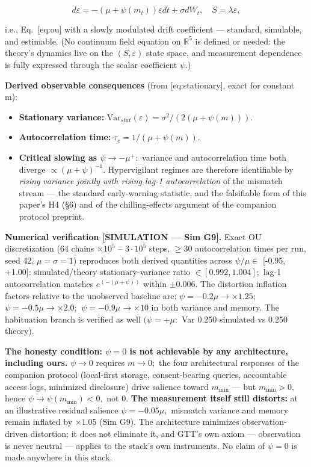 \documentclass[
]{article}
\begin{document}
\begin{equation}
d\varepsilon = -(\mu + \psi(m_t)) \varepsilon dt + \sigma dW_t, \quad \dot{S} = \lambda \varepsilon,
\label{eq:oupsi}
\end{equation}

i.e., Eq.~{[}eq:ou{]} with a slowly modulated drift coefficient ---
standard, simulable, and estimable. (No continuum field equation on
\(\mathbb{R}^{5}\) is defined or needed: the theory's dynamics live on
the \((S, \varepsilon)\) state space, and measurement dependence is
fully expressed through the scalar coefficient \(\psi.\))

\textbf{Derived observable consequences} (from {[}eq:stationary{]},
exact for constant m):

\begin{itemize}
\item
  \textbf{Stationary variance:}
  \(\mathrm{Var}_{stat}(\varepsilon) = \sigma^{2} / (2(\mu + \psi(m))).\)
\item
  \textbf{Autocorrelation time:} \(\tau_c = 1 / (\mu + \psi(m)).\)
\item
  \textbf{Critical slowing as \(\psi \to -\mu^{+}:\)} variance and
  autocorrelation time both diverge \(\propto (\mu + \psi)^{-1}.\)
  Hypervigilant regimes are therefore identifiable by \emph{rising
  variance jointly with rising lag-1 autocorrelation} of the mismatch
  stream --- the standard early-warning statistic, and the falsifiable
  form of this paper's H4 (§6) and of the chilling-effects argument of
  the companion protocol preprint.
\end{itemize}

\textbf{Numerical verification {[}SIMULATION --- Sim G9{]}.} Exact OU
discretization (64 chains \(\times 10^{5}\) -- \(3\cdot10^{5}\) steps,
\(\geq 30\) autocorrelation times per run, seed 42,
\(\mu = \sigma = 1\)) reproduces both derived quantities across
\(\psi/\mu \in\) {[}-0.95, +1.00{]}: simulated/theory
stationary-variance ratio \(\in [0.992, 1.004];\) lag-1 autocorrelation
matches \(e^(-(\mu+\psi))\) within \(\pm0.006.\) The distortion
inflation factors relative to the unobserved baseline are:
\textbf{\(\psi = -0.2\mu \to \times1.25;\)
\(\psi = -0.5\mu \to \times2.0;\) \(\psi = -0.9\mu \to \times10\)} in
both variance and memory. The habituation branch is verified as well
\((\psi = +\mu:\) Var 0.250 simulated vs 0.250 theory).

\textbf{The honesty condition: \(\psi = 0\) is not achievable by any
architecture, including ours.} \(\psi \to 0\) requires \(m \to 0;\) the
four architectural responses of the companion protocol (local-first
storage, consent-bearing queries, accountable access logs, minimized
disclosure) drive salience toward \(m_{\min}\) --- but \(m_{\min} > 0,\)
hence \(\psi \to \psi(m_{\min}) < 0,\) not 0. \textbf{The measurement
itself still distorts:} at an illustrative residual salience
\(\psi = -0.05\mu,\) mismatch variance and memory remain inflated by
\(\times1.05\) (Sim G9). The architecture minimizes observation-driven
distortion; it does not eliminate it, and GTT's own axiom ---
observation is never neutral --- applies to the stack's own instruments.
No claim of \(\psi = 0\) is made anywhere in this stack.
\end{document}
